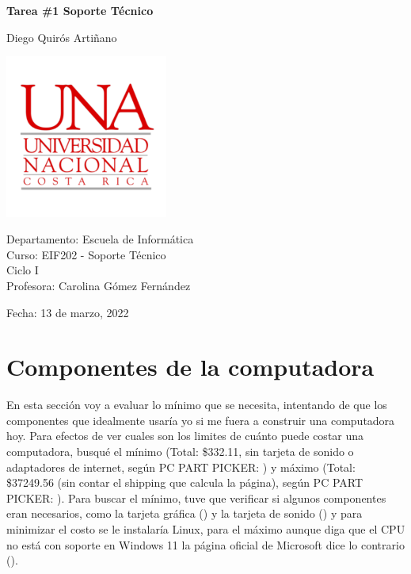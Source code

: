 \documentclass[12pt, a4paper]{article}
\begin{document}
\begin{titlepage}
    \begin{flushleft}
        \textbf{\Large Tarea \#1 Soporte Técnico}
        \newline

        \large Diego Quirós Artiñano \\
        
        \vfill
        
        \includegraphics[width=0.4\textwidth]{UNA.png}

        Departamento: Escuela de Informática \\
        Curso: EIF202 - Soporte Técnico \\
        Ciclo I \\
        Profesora: Carolina Gómez Fernández \newline

        Fecha: 13 de marzo, 2022
    \end{flushleft}
\end{titlepage}


\section{Componentes de la computadora}
\balance
En esta sección voy a evaluar lo mínimo que se necesita, intentando de que los componentes que idealmente usaría yo si me fuera a construir una computadora hoy. Para efectos de ver cuales son los limites de cuánto puede costar una computadora, busqué el mínimo (Total: \$332.11, sin tarjeta de sonido o adaptadores de internet, según PC PART PICKER: \cite{partpickerminimum}) y máximo (Total: \$37249.56 (sin contar el shipping que calcula la página), según PC PART PICKER: \cite{partpickermaximum}). Para buscar el mínimo, tuve que verificar si algunos componentes eran necesarios, como la tarjeta gráfica (\cite{graphicsCardNecessary}) y la tarjeta de sonido (\cite{soundcardNecessary}) y para minimizar el costo se le instalaría Linux, para el máximo aunque diga que el CPU no está con soporte en Windows 11 la página oficial de Microsoft dice lo contrario (\cite{windows11Support}). 
\end{document}
